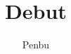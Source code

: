 \documentclass{beamer}
\title{Debut}
\author{Penbu}
\begin{document}
  \maketitle
  \begin{frame}
  \end{frame}
\end{document}

